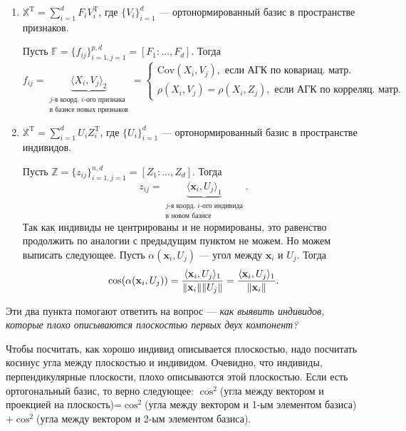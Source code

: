 \documentclass[specialist, 12pt,
subf, %
href, colorlinks=true,
substylefile = spbu.rtx,
]{disser}
\begin{document}
\begin{enumerate}
	\item $\mathbb{X}^\mathrm{T}=\sum\limits_{i =1}^d F_i V_i^\mathrm{T}$, где $\{V_i\}_{i=1}^d$ --- ортонормированный базис в пространстве признаков.
	
	Пусть $\mathbb{F}=\{f_{ij}\}_{i=1,j=1}^{p,d}=[F_1:\ldots,F_d]$. Тогда
	\begin{equation*}
	f_{ij}=\underbrace{\langle X_i, V_j \rangle_2}_{\substack{j\text{-я коорд. } i\text{-ого признака} \\ \text{в базисе новых признаков}}} = \begin{cases}
	\text{Cov} (X_i,V_j), \text{ если АГК по ковариац. матр.} \\
	\rho(X_i,V_j)=\rho(X_i,Z_j), \text{ если АГК по корреляц. матр.}
	\end{cases}
	\end{equation*}
	
	
	\item $\mathbb{X}^\mathrm{T}=\sum\limits_{i =1}^d U_i Z_i^\mathrm{T}$, где $\{U_i\}_{i=1}^d$ --- ортонормированный базис в пространстве индивидов.
	
	Пусть $\mathbb{Z}=\{z_{ij}\}_{i=1,j=1}^{n,d}=[Z_1:\ldots,Z_d]$. Тогда
	\begin{equation*}
	z_{ij}=\underbrace{\langle \mathbf{x}_i, U_j \rangle_1}_{\substack{j\text{-я коорд. } i\text{-ого индивида} \\ \text{в новом базисе}}}.
	\end{equation*}
	Так как индивиды не центрированы и не нормированы, это равенство продолжить по аналогии с предыдущим пунктом не можем. Но можем выписать следующее. Пусть $\alpha(\mathbf{x}_i,U_j)$ --- угол между $\mathbf{x}_i$ и $U_j$. Тогда
	\begin{equation*}
	\cos(\alpha(\mathbf{x}_i,U_j)) = \frac{\langle \mathbf{x}_i, U_j \rangle_1}{\Arrowvert \mathbf{x}_i \Arrowvert \Arrowvert U_j \Arrowvert} = \frac{\langle \mathbf{x}_i, U_j \rangle_1}{\Arrowvert \mathbf{x}_i \Arrowvert}.
	\end{equation*}
	
\end{enumerate}
Эти два пункта помогают ответить на вопрос --- \textit{как выявить индивидов, которые плохо описываются плоскостью первых двух компонент?}

Чтобы посчитать, как хорошо индивид описывается плоскостью, надо посчитать косинус угла между плоскостью и индивидом. Очевидно, что индивиды, перпендикулярные плоскости, плохо описываются этой плоскостью. Если есть ортогональный базис, то верно следующее: $\cos^2$(угла между вектором и проекцией на плоскость)=$\cos^2$(угла между вектором и 1-ым элементом базиса)$+\cos^2$(угла между вектором и 2-ым элементом базиса).
\end{document}
